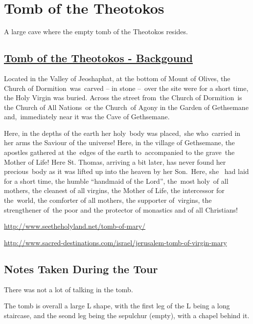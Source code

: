 \documentclass[letterpaper]{report}
\begin{document}
\section{Tomb of the Theotokos}
A large cave where the empty tomb of the Theotokos resides.
\begin{multicols}{2}

\subsection{
\href{https://orthodoxword.wordpress.com/2010/08/15/the-tomb-of-the-most-holy-virgin-jerusalem}{
Tomb of the Theotokos - Backgound}}

Located in the Valley of Jeoshaphat, at the bottom of Mount of Olives, the Church of Dormition was carved – in stone – over the site were for a short time, the Holy Virgin was buried. Across the street from the Church of Dormition is the Church of All Nations or the Church of Agony in the Garden of Gethsemane and, immediately near it was the Cave of Gethsemane.

Here, in the depths of the earth her holy body was placed, she who carried in her arms the Saviour of the universe! Here, in the village of Gethsemane, the apostles gathered at the edges of the earth to accompanied to the grave the Mother of Life! Here St. Thomas, arriving a bit later, has never found her precious body as it was lifted up into the heaven by her Son. Here, she  had laid for a short time, the humble “handmaid of the Lord”, the most holy of all mothers, the cleanest of all virgins, the Mother of Life, the intercessor for the world, the comforter of all mothers, the supporter of virgins, the strengthener of the poor and the protector of monastics and of all Christians!

\url{http://www.seetheholyland.net/tomb-of-mary/}

\url{http://www.sacred-destinations.com/israel/jerusalem-tomb-of-virgin-mary}

\subsection{Notes Taken During the Tour}	
There was not a lot of talking in the tomb.

The tomb is overall a large L shape, with the first leg of the L being a long staircase, and the seond leg being the
sepulchur (empty), with a chapel behind it.

\end{multicols}
\end{document}
